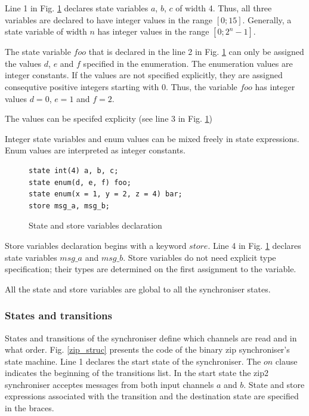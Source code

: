 Line 1 in Fig. \ref{sync_statevar} declares state variables $a$, $b$, $c$ of width 4. Thus, all three variables are declared to have integer values in the range $[0; 15]$. Generally, a state variable of width $n$ has integer values in the range $[0; 2^{n}-1]$.

The state variable $foo$ that is declared in the line 2 in Fig. \ref{sync_statevar} can only be assigned the values $d$, $e$ and $f$ specified in the enumeration. The enumeration values are integer constants. If the values are not specified explicitly, they are assigned consequtive positive integers starting with 0.
Thus, the variable $foo$ has integer values $d=0$, $e=1$ and $f=2$. %


The values can be specifed explicity (see line 3 in Fig. \ref{sync_statevar})

Integer state variables and enum values can be mixed freely in state expressions. Enum values are interpreted as integer constants.%

\begin{figure}[h!]
\lstset{numbers=left, numberstyle=\small, stepnumber=1, numbersep=8pt}
\begin{lstlisting}[frame=single]
state int(4) a, b, c;
state enum(d, e, f) foo;
state enum(x = 1, y = 2, z = 4) bar;
store msg_a, msg_b;
\end{lstlisting}
\caption{State and store variables declaration}
\label{sync_statevar}
\end{figure}

Store variables declaration begins with a keyword $store$. Line 4 in Fig. \ref{sync_statevar} declares state variables $msg\_a$ and $msg\_b$. Store variables do not need explicit type specification; their types are determined on the first assignment to the variable.

All the state and store variables are global to all the synchroniser states.


  \subsubsection{States and transitions}
States and transitions of the synchroniser define which channels are read and in what order. Fig. \ref{zip_struc} presents the code of the binary zip synchroniser's state machine. Line 1 declares the start state of the synchroniser. The $on$ clause indicates the beginning of the transitions list. In the start state the zip2 synchroniser acceptes messages from both input channels $a$ and $b$. State and store expressions associated with the transition and the destination state are specified in the braces.

